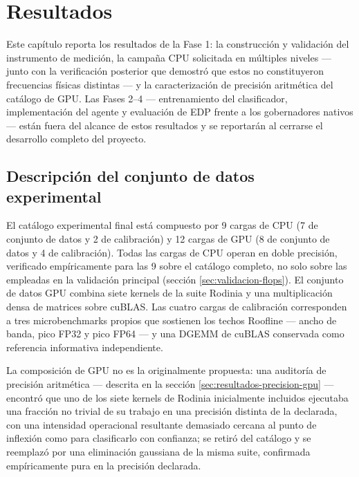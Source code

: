 \documentclass[12pt,oneside,spanish]{book}
\begin{document}

\chapter{Resultados}

Este capítulo reporta los resultados de la Fase 1: la construcción y validación del instrumento de medición, la campaña CPU solicitada en múltiples niveles --- junto con la verificación posterior que demostró que estos no constituyeron frecuencias físicas distintas --- y la caracterización de precisión aritmética del catálogo de GPU. Las Fases 2--4 --- entrenamiento del clasificador, implementación del agente y evaluación de EDP frente a los gobernadores nativos --- están fuera del alcance de estos resultados y se reportarán al cerrarse el desarrollo completo del proyecto.

\section{Descripción del conjunto de datos experimental}

El catálogo experimental final está compuesto por 9 cargas de CPU (7 de conjunto de datos y 2 de calibración) y 12 cargas de GPU (8 de conjunto de datos y 4 de calibración). Todas las cargas de CPU operan en doble precisión, verificado empíricamente para las 9 sobre el catálogo completo, no solo sobre las empleadas en la validación principal (sección \ref{sec:validacion-flops}). El conjunto de datos GPU combina siete kernels de la suite Rodinia y una multiplicación densa de matrices sobre cuBLAS. Las cuatro cargas de calibración corresponden a tres microbenchmarks propios que sostienen los techos Roofline --- ancho de banda, pico FP32 y pico FP64 --- y una DGEMM de cuBLAS conservada como referencia informativa independiente.

La composición de GPU no es la originalmente propuesta: una auditoría de precisión aritmética --- descrita en la sección \ref{sec:resultados-precision-gpu} --- encontró que uno de los siete kernels de Rodinia inicialmente incluidos ejecutaba una fracción no trivial de su trabajo en una precisión distinta de la declarada, con una intensidad operacional resultante demasiado cercana al punto de inflexión como para clasificarlo con confianza; se retiró del catálogo y se reemplazó por una eliminación gaussiana de la misma suite, confirmada empíricamente pura en la precisión declarada.
\end{document}
